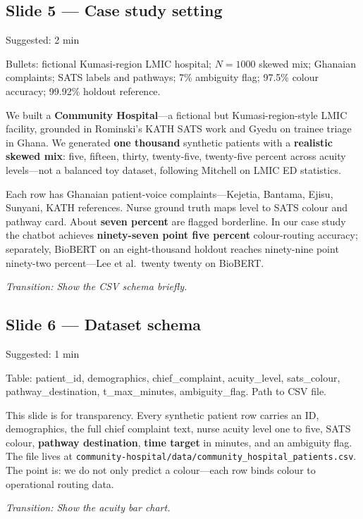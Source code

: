 \documentclass[11pt]{article}
\newcommand{\transition}[1]{\medskip\noindent\textit{\textcolor{knustMuted}{Transition: #1}}\medskip}
\newcommand{\deck}[1]{{\small\texttt{\textcolor{knustMuted}{main.pdf slide: #1}}}}
\newcommand{\slide}[3]{%
  \subsection{Slide #1 --- #2}%
  \noindent\deck{#1 --- #3}\par\smallskip}
\begin{document}
\slide{5}{Case study setting}{Community Hospital}
\begin{timing}Suggested: 2 min\end{timing}
\begin{onscreen}
Bullets: fictional Kumasi-region LMIC hospital; $N=1000$ skewed mix; Ghanaian complaints; SATS labels
and pathways; 7\% ambiguity flag; 97.5\% colour accuracy; 99.92\% holdout reference.
\end{onscreen}
\begin{saybox}
We built a \textbf{Community Hospital}---a fictional but Kumasi-region-style LMIC facility, grounded in
Rominski's KATH SATS work and Gyedu on trainee triage in Ghana. We generated \textbf{one thousand}
synthetic patients with a \textbf{realistic skewed mix}: five, fifteen, thirty, twenty-five, twenty-five
percent across acuity levels---not a balanced toy dataset, following Mitchell on LMIC ED statistics.

Each row has Ghanaian patient-voice complaints---Kejetia, Bantama, Ejisu, Sunyani, KATH references.
Nurse ground truth maps level to SATS colour and pathway card. About \textbf{seven percent} are flagged
borderline. In our case study the chatbot achieves \textbf{ninety-seven point five percent}
colour-routing accuracy; separately, BioBERT on an eight-thousand holdout reaches ninety-nine point
ninety-two percent---Lee et al.\ twenty twenty on BioBERT.
\end{saybox}
\transition{Show the CSV schema briefly.}

\slide{6}{Dataset schema}{Community Hospital}
\begin{timing}Suggested: 1 min\end{timing}
\begin{onscreen}
Table: patient\_id, demographics, chief\_complaint, acuity\_level, sats\_colour, pathway\_destination,
t\_max\_minutes, ambiguity\_flag. Path to CSV file.
\end{onscreen}
\begin{saybox}
This slide is for transparency. Every synthetic patient row carries an ID, demographics, the full
chief complaint text, nurse acuity level one to five, SATS colour, \textbf{pathway destination},
\textbf{time target} in minutes, and an ambiguity flag. The file lives at
\texttt{community-hospital/data/community\_hospital\_patients.csv}. The point is: we do not only predict
a colour---each row binds colour to operational routing data.
\end{saybox}
\transition{Show the acuity bar chart.}
\end{document}
